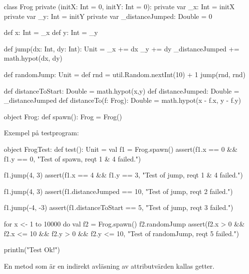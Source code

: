 \SOLUTION


\TaskSolved \what


\SubtaskSolved
\begin{Code}
class Frog private (initX: Int = 0, initY: Int = 0):
    private var _x: Int = initX
    private var _y: Int = initY
    private var _distanceJumped: Double = 0

    def x: Int = _x
    def y: Int = _y

    def jump(dx: Int, dy: Int): Unit =
        _x += dx
        _y += dy
        _distanceJumped += math.hypot(dx, dy)


    def randomJump: Unit =
        def rnd = util.Random.nextInt(10) + 1
        jump(rnd, rnd)

    def distanceToStart: Double = math.hypot(x,y)
    def distanceJumped: Double = _distanceJumped
    def distanceTo(f: Frog): Double = math.hypot(x - f.x, y - f.y)

object Frog:
    def spawn(): Frog = Frog()
\end{Code}

\SubtaskSolved Exempel på testprogram:
\begin{Code}
object FrogTest:
    def test(): Unit =
        val f1 = Frog.spawn()
        assert(f1.x == 0 && f1.y == 0, "Test of spawn,
            reqt 1 & 4 failed.")

        f1.jump(4, 3)
        assert(f1.x == 4 && f1.y == 3, "Test of jump,
            reqt 1 & 4 failed.")

        f1.jump(4, 3)
        assert(f1.distanceJumped == 10, "Test of jump, reqt 2 failed.")

        f1.jump(-4, -3)
        assert(f1.distanceToStart == 5, "Test of jump, reqt 3 failed.")

        for x <- 1 to 10000 do
            val f2 = Frog.spawn()
            f2.randomJump
            assert(f2.x > 0 && f2.x <= 10 && f2.y > 0 && f2.y <= 10,
                "Test of randomJump, reqt 5 failed.")

        println("Test Ok!")
\end{Code}

\SubtaskSolved  En metod som är en indirekt avläsning av attributvärden kallas getter.

